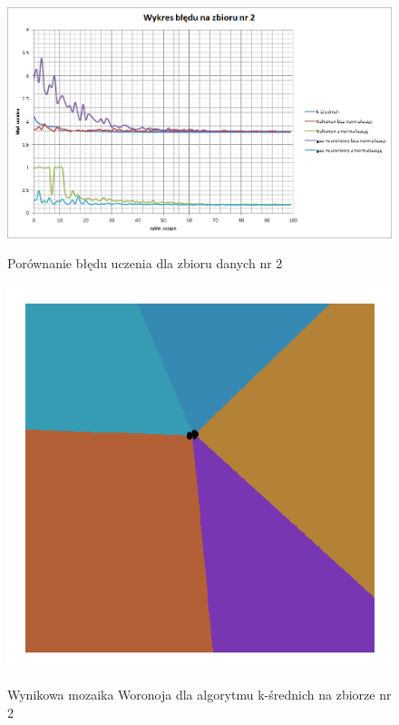 \documentclass{classrep}
\begin{document}
\begin{figure}[h]
	\centering
		\includegraphics[scale=0.55]{pictures/183566_2.png}
	\label{fig:183566_2}
	\caption{Porównanie błędu uczenia dla zbioru danych nr 2}
\end{figure}

\begin{figure}[h]
	\centering
		\includegraphics[scale=0.55]{pictures/kmeans_8_neuronow_zbior_1.png}
	\label{fig:kmeans_8_neuronow_zbior_1}
	\caption{Wynikowa mozaika Woronoja dla algorytmu k-średnich na zbiorze nr 2}
\end{figure}
\end{document}
